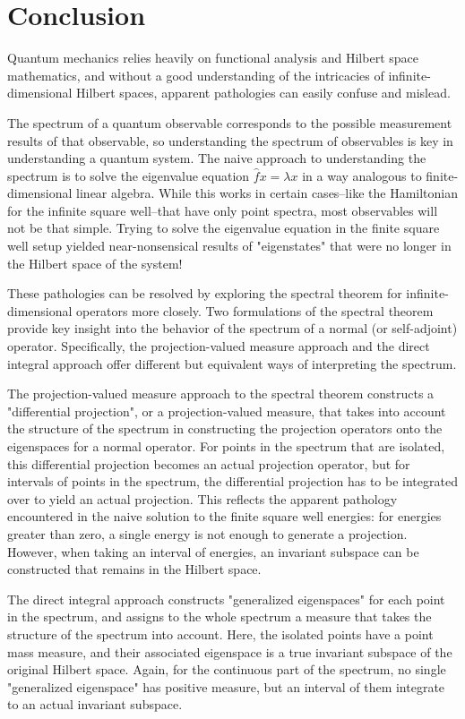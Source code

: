 \section{Conclusion}

Quantum mechanics relies heavily on functional analysis and Hilbert space
mathematics, and without a good understanding of the intricacies of
infinite-dimensional Hilbert spaces, apparent pathologies can easily confuse and
mislead.

The spectrum of a quantum observable corresponds to the possible measurement
results of that observable, so understanding the spectrum of observables is key
in understanding a quantum system. The naive approach to understanding the
spectrum is to solve the eigenvalue equation $\hat{f}x=\lambda x$ in a way
analogous to finite-dimensional linear algebra. While this works in certain
cases--like the Hamiltonian for the infinite square well--that have only point
spectra, most observables will not be that simple. Trying to solve the
eigenvalue equation in the finite square well setup yielded near-nonsensical
results of "eigenstates" that were no longer in the Hilbert space of the system!

These pathologies can be resolved by exploring the spectral theorem for
infinite-dimensional operators more closely. Two formulations of the spectral
theorem provide key insight into the behavior of the spectrum of a normal (or
self-adjoint) operator. Specifically, the projection-valued measure approach and
the direct integral approach offer different but equivalent ways of interpreting
the spectrum.

The projection-valued measure approach to the spectral theorem constructs a
"differential projection", or a projection-valued measure, that takes into
account the structure of the spectrum in constructing the projection operators
onto the eigenspaces for a normal operator. For points in the spectrum that are
isolated, this differential projection becomes an actual projection operator,
but for intervals of points in the spectrum, the differential projection has to
be integrated over to yield an actual projection. This reflects the apparent
pathology encountered in the naive solution to the finite square well energies:
for energies greater than zero, a single energy is not enough to generate a
projection. However, when taking an interval of energies, an invariant subspace
can be constructed that remains in the Hilbert space.

The direct integral approach constructs "generalized eigenspaces" for each point
in the spectrum, and assigns to the whole spectrum a measure that takes the
structure of the spectrum into account. Here, the isolated points have a point
mass measure, and their associated eigenspace is a true invariant subspace of
the original Hilbert space. Again, for the continuous part of the spectrum, no
single "generalized eigenspace" has positive measure, but an interval of them
integrate to an actual invariant subspace.

